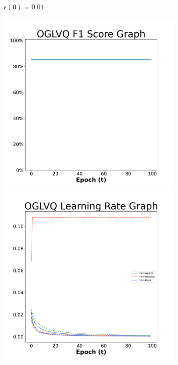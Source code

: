 \begin{figure}[H]
\begin{subfigure}{0.3\textwidth}
  \caption{$\epsilon(0)=0.01$}
\end{subfigure}\hfil %
\begin{subfigure}{0.3\textwidth}
  \includegraphics[width=\linewidth]{images/exper2/iris/OGLVQ_0.03_f1.png}
  \includegraphics[width=\linewidth]{images/exper2/iris/OGLVQ_0.03_lr.png}

\end{subfigure}
\end{figure}
